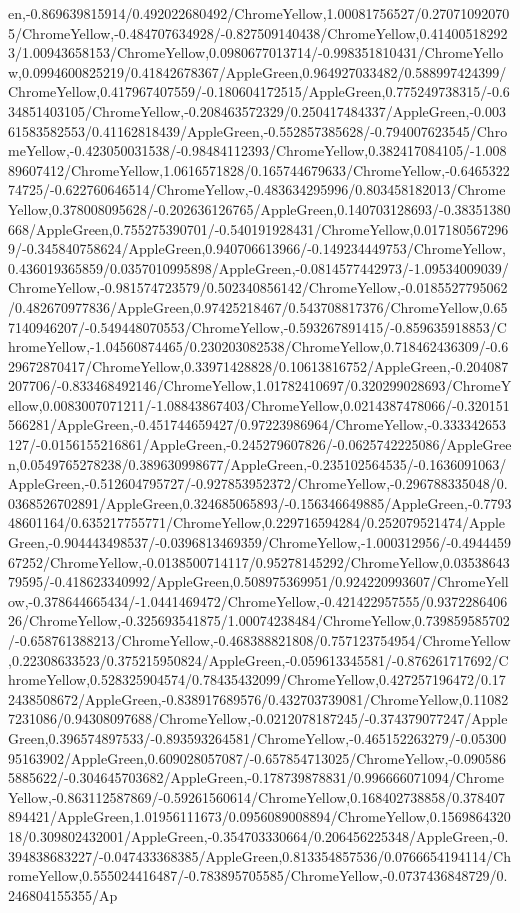 {\begin{tikzternal}
en,-0.869639815914/0.492022680492/ChromeYellow,1.00081756527/0.270710920705/ChromeYellow,-0.484707634928/-0.827509140438/ChromeYellow,0.414005182923/1.00943658153/ChromeYellow,0.0980677013714/-0.998351810431/ChromeYellow,0.0994600825219/0.41842678367/AppleGreen,0.964927033482/0.588997424399/ChromeYellow,0.417967407559/-0.180604172515/AppleGreen,0.775249738315/-0.634851403105/ChromeYellow,-0.208463572329/0.250417484337/AppleGreen,-0.00361583582553/0.41162818439/AppleGreen,-0.552857385628/-0.794007623545/ChromeYellow,-0.423050031538/-0.98484112393/ChromeYellow,0.382417084105/-1.00889607412/ChromeYellow,1.0616571828/0.165744679633/ChromeYellow,-0.646532274725/-0.622760646514/ChromeYellow,-0.483634295996/0.803458182013/ChromeYellow,0.378008095628/-0.202636126765/AppleGreen,0.140703128693/-0.38351380668/AppleGreen,0.755275390701/-0.540191928431/ChromeYellow,0.0171805672969/-0.345840758624/AppleGreen,0.940706613966/-0.149234449753/ChromeYellow,0.436019365859/0.0357010995898/AppleGreen,-0.0814577442973/-1.09534009039/ChromeYellow,-0.981574723579/0.502340856142/ChromeYellow,-0.0185527795062/0.482670977836/AppleGreen,0.97425218467/0.543708817376/ChromeYellow,0.657140946207/-0.549448070553/ChromeYellow,-0.593267891415/-0.859635918853/ChromeYellow,-1.04560874465/0.230203082538/ChromeYellow,0.718462436309/-0.629672870417/ChromeYellow,0.33971428828/0.10613816752/AppleGreen,-0.204087207706/-0.833468492146/ChromeYellow,1.01782410697/0.320299028693/ChromeYellow,0.0083007071211/-1.08843867403/ChromeYellow,0.0214387478066/-0.320151566281/AppleGreen,-0.451744659427/0.97223986964/ChromeYellow,-0.333342653127/-0.0156155216861/AppleGreen,-0.245279607826/-0.0625742225086/AppleGreen,0.0549765278238/0.389630998677/AppleGreen,-0.235102564535/-0.1636091063/AppleGreen,-0.512604795727/-0.927853952372/ChromeYellow,-0.296788335048/0.0368526702891/AppleGreen,0.324685065893/-0.156346649885/AppleGreen,-0.779348601164/0.635217755771/ChromeYellow,0.229716594284/0.252079521474/AppleGreen,-0.904443498537/-0.0396813469359/ChromeYellow,-1.000312956/-0.494445967252/ChromeYellow,-0.0138500714117/0.95278145292/ChromeYellow,0.0353864379595/-0.418623340992/AppleGreen,0.508975369951/0.924220993607/ChromeYellow,-0.378644665434/-1.0441469472/ChromeYellow,-0.421422957555/0.937228640626/ChromeYellow,-0.325693541875/1.00074238484/ChromeYellow,0.739859585702/-0.658761388213/ChromeYellow,-0.468388821808/0.757123754954/ChromeYellow,0.22308633523/0.375215950824/AppleGreen,-0.059613345581/-0.876261717692/ChromeYellow,0.528325904574/0.78435432099/ChromeYellow,0.427257196472/0.172438508672/AppleGreen,-0.838917689576/0.432703739081/ChromeYellow,0.110827231086/0.94308097688/ChromeYellow,-0.0212078187245/-0.374379077247/AppleGreen,0.396574897533/-0.893593264581/ChromeYellow,-0.465152263279/-0.0530095163902/AppleGreen,0.609028057087/-0.657854713025/ChromeYellow,-0.0905865885622/-0.304645703682/AppleGreen,-0.178739878831/0.996666071094/ChromeYellow,-0.863112587869/-0.59261560614/ChromeYellow,0.168402738858/0.378407894421/AppleGreen,1.01956111673/0.0956089008894/ChromeYellow,0.156986432018/0.309802432001/AppleGreen,-0.354703330664/0.206456225348/AppleGreen,-0.394838683227/-0.047433368385/AppleGreen,0.813354857536/0.0766654194114/ChromeYellow,0.555024416487/-0.783895705585/ChromeYellow,-0.0737436848729/0.246804155355/Ap
\end{tikzternal}}
